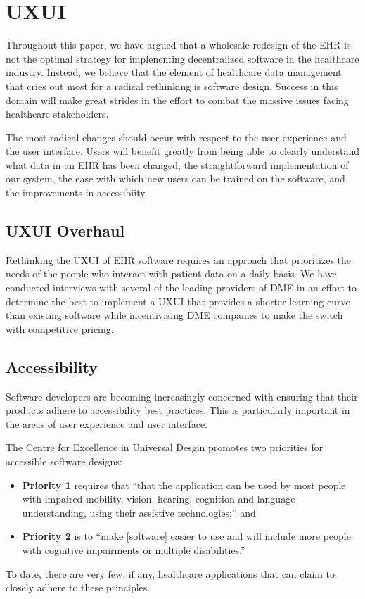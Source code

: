 \documentclass[letterpaper]{article}
\begin{document}
\section{UXUI}
Throughout this paper, we have argued that a wholesale redesign of the EHR is not the optimal strategy for implenenting decentralized software in the healthcare industry. Instead, we believe that the element of healthcare data management that cries out most for a radical rethinking is software design. Success in this domain will make great strides in the effort to combat the massive issues facing healthcare stakeholders.%

The most radical changes should occur with respect to the user experience and the user interface. Users will benefit greatly from being able to clearly understand what data in an EHR has been changed, the straightforward implementation of our system, the ease with which new users can be trained on the software, and the improvements in accessibiity.%

\subsection{UXUI Overhaul}
Rethinking the UXUI of EHR software requires an approach that prioritizes the needs of the people who interact with patient data on a daily basis. We have conducted interviews with several of the leading providers of DME in an effort to determine the best to implement a UXUI that provides a shorter learning curve than existing software while incentivizing DME companies to make the switch with competitive pricing.%

\subsection{Accessibility}
Software developers are becoming increasingly concerned with ensuring that their products adhere to accessibility best practices. This is particularly important in the areas of user experience and user interface.%

The Centre for Excellence in Universal Desgin promotes two priorities for accessible software designs:%
  \begin{itemize}
    \item \textbf{Priority 1} requires that ``that the application can be used by most people with impaired mobility, vision, hearing, cognition and language understanding, using their assistive technologies;'' and
    \item \textbf{Priority 2} is to ``make [software] easier to use and will include more people with cognitive impairments or multiple disabilities.''
  \end{itemize}
To date, there are very few, if any, healthcare applications that can claim to closely adhere to these principles.%
\end{document}
